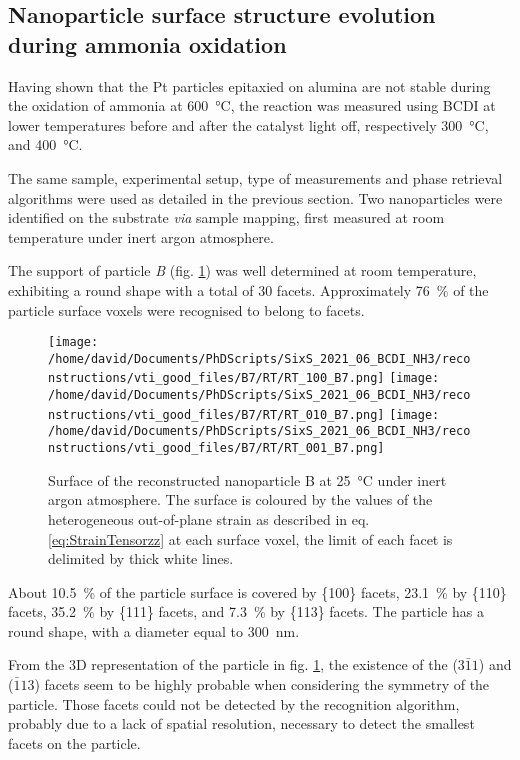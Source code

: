 \subsection{Nanoparticle surface structure evolution during ammonia oxidation}\label{sec:BCDIAmmoniaOxidation}

Having shown that the Pt particles epitaxied on alumina are not stable during the oxidation of ammonia at \qty{600}{\degreeCelsius}, the reaction was measured using BCDI at lower temperatures before and after the catalyst light off, respectively \qty{300}{\degreeCelsius}, and \qty{400}{\degreeCelsius}.

The same sample, experimental setup, type of measurements and phase retrieval algorithms were used as detailed in the previous section.
Two nanoparticles were identified on the substrate \textit{via} sample mapping, first measured at room temperature under inert argon atmosphere.

The support of particle \textit{B} (fig. \ref{fig:B7Facets}) was well determined at room temperature, exhibiting a round shape with a total of 30 facets.
Approximately \qty{76}{\percent} of the particle surface voxels were recognised to belong to facets.

\begin{figure}[!htb]
    \centering
    \texttt{[image: /home/david/Documents/PhDScripts/SixS\_2021\_06\_BCDI\_NH3/reconstructions/vti\_good\_files/B7/RT/RT\_100\_B7.png]}
    \texttt{[image: /home/david/Documents/PhDScripts/SixS\_2021\_06\_BCDI\_NH3/reconstructions/vti\_good\_files/B7/RT/RT\_010\_B7.png]}
    \texttt{[image: /home/david/Documents/PhDScripts/SixS\_2021\_06\_BCDI\_NH3/reconstructions/vti\_good\_files/B7/RT/RT\_001\_B7.png]}
    \caption{
        Surface of the reconstructed nanoparticle B at \qty{25}{\degreeCelsius} under inert argon atmosphere.
        The surface is coloured by the values of the heterogeneous out-of-plane strain as described in eq. \ref{eq:StrainTensorzz} at each surface voxel, the limit of each facet is delimited by thick white lines.
    }
    \label{fig:B7Facets}
\end{figure}

About \qty{10.5}{\percent} of the particle surface is covered by \{100\} facets, \qty{23.1}{\percent} by \{110\} facets, \qty{35.2}{\percent} by \{111\} facets, and \qty{7.3}{\percent} by \{113\} facets.
The particle has a round shape, with a diameter equal to \qty{300}{\nm}.

From the 3D representation of the particle in fig. \ref{fig:B7Facets}, the existence of the ($3\bar{1}1$) and ($\bar{1}13$) facets seem to be highly probable when considering the symmetry of the particle.
Those facets could not be detected by the recognition algorithm, probably due to a lack of spatial resolution, necessary to detect the smallest facets on the particle.

